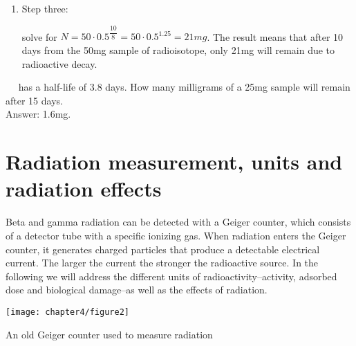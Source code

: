 \documentclass[main.tex]{subfiles}
\begin{document}
\begin{example}
\begin{enumerate}[label=\protect\circled{\color{white}\arabic*}]
\begin{tikzpicture}[overlay, remember picture,node distance =1.5cm]
    \end{tikzpicture}\vspace{12mm} %
\item \begin{bf}Step three:\end{bf} solve for $N=50 \cdot 0.5^{\dfrac{10}{8}}=50 \cdot 0.5^{1.25}=21mg$. The result means that after 10 days from the 50mg sample of radioisotope, only 21mg will remain due to radioactive decay.
\end{enumerate}
\faDiamond\ \
 has a half-life of 3.8 days. How many milligrams of a 25mg sample will remain after 15 days.\\
\flushright Answer: 1.6mg.
\end{example}%



\section{Radiation measurement, units and radiation effects}
Beta and gamma radiation can be detected with a  Geiger counter, which consists of a detector tube with a specific ionizing gas. When radiation enters the Geiger counter, it generates charged particles that produce a detectable electrical current. The larger the current the stronger the radioactive source. In the following we will address the different units of radioactivity--activity, adsorbed dose and biological damage--as well as the effects of radiation.
\begin{marginfigure}[-4cm]%
      \texttt{[image: chapter4/figure2]}
      \label{fig:marginfig}
      \caption{An old Geiger counter used to measure radiation}
	\end{marginfigure}%
\end{document}
